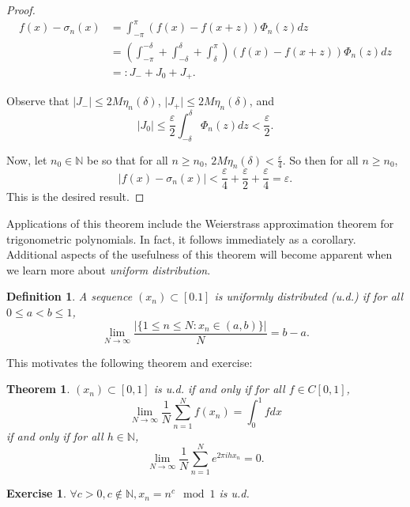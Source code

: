 \documentclass{article}
\newtheorem{thm}{Theorem}[section]
\newtheorem{defn}{Definition}[section]
\newtheorem{exer}{Exercise}[section]
\begin{document}
\begin{proof}
\begin{align}
f(x) - \sigma_{n}(x) 
	&= \int_{-\pi}^{\pi} (f(x) - f(x+z))\Phi_{n}(z)dz \\ 
	&= \left(\int_{-\pi}^{-\delta} 
	+ \int_{-\delta}^{\delta} 
	+ \int_{\delta}^{\pi}\right) (f(x) - f(x+z))\Phi_{n}(z)dz \\
	&=: J_{-} + J_{0} + J_{+}.
\end{align}

Observe that $\vert J_{-} \vert \leq 2M\eta_{n}(\delta)$, $\vert J_{+} \vert \leq 2M\eta_{n}(\delta)$, and 
$$
\vert J_{0} \vert \leq \frac{\varepsilon}{2} \int_{-\delta}^{\delta} \Phi_{n}(z)dz < \frac{\varepsilon}{2}.
$$

Now, let $n_{0} \in \mathbb{N}$ be so that for all $n \geq n_{0}$, $2M\eta_{n}(\delta) < \frac{\varepsilon}{4}$. So then for all $n \geq n_{0}$, 
$$
\vert f(x) - \sigma_{n}(x) \vert <  \frac{\varepsilon}{4} + \frac{\varepsilon}{2} + \frac{\varepsilon}{4} = \varepsilon.
$$ 
This is the desired result.
\end{proof}


Applications of this theorem include the Weierstrass approximation theorem for trigonometric polynomials. In fact, it follows immediately as a corollary. Additional aspects of the usefulness of this theorem will become apparent when we learn more about \textit{uniform distribution}.

\begin{defn}
A sequence $(x_{n}) \subset [0.1]$ is uniformly distributed (u.d.) if for all $0 \leq a < b \leq 1$,
$$
\lim_{N \to \infty} \frac{\vert\{ 1 \leq n \leq N : x_{n} \in (a,b) \} \vert}{N} = b-a.
$$
\end{defn}

This motivates the following theorem and exercise:
\begin{thm}
$(x_{n}) \subset [0,1]$ is u.d. if and only if for all $f \in C[0,1]$,
$$
\lim_{N \to \infty} \frac{1}{N} \sum_{n=1}^{N} f(x_{n}) = \int_{0}^{1}fdx
$$
if and only if for all $h \in \mathbb{N}$,
$$
\lim_{N \to \infty} \frac{1}{N} \sum_{n=1}^{N} e^{2\pi i h x_n} = 0.
$$
\end{thm}

\begin{exer}
$\forall c > 0, c \notin \mathbb{N}, x_{n} = n^{c}\mod 1$ is u.d.
\end{exer}
\end{document}
